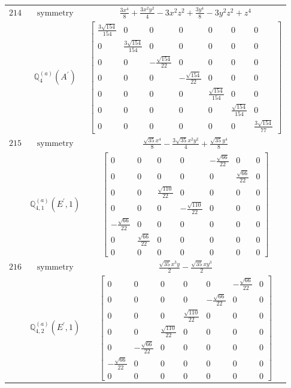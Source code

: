 \documentclass[fleqn,8pt,landscape]{jsarticle}
\begin{document}
\begin{longtable}{ccc}
$ 214 $ & $ \text{symmetry} $ & $ \frac{3 x^{4}}{8} + \frac{3 x^{2} y^{2}}{4} - 3 x^{2} z^{2} + \frac{3 y^{4}}{8} - 3 y^{2} z^{2} + z^{4} $ \\
$  $ & $ \mathbb{Q}_{4}^{(a)}(A^{\prime}) $ & $ \begin{bmatrix} \frac{3 \sqrt{154}}{154} & 0 & 0 & 0 & 0 & 0 & 0 \\ 0 & \frac{3 \sqrt{154}}{154} & 0 & 0 & 0 & 0 & 0 \\ 0 & 0 & - \frac{\sqrt{154}}{22} & 0 & 0 & 0 & 0 \\ 0 & 0 & 0 & - \frac{\sqrt{154}}{22} & 0 & 0 & 0 \\ 0 & 0 & 0 & 0 & \frac{\sqrt{154}}{154} & 0 & 0 \\ 0 & 0 & 0 & 0 & 0 & \frac{\sqrt{154}}{154} & 0 \\ 0 & 0 & 0 & 0 & 0 & 0 & \frac{3 \sqrt{154}}{77} \end{bmatrix} $ \\ \hline
$ 215 $ & $ \text{symmetry} $ & $ \frac{\sqrt{35} x^{4}}{8} - \frac{3 \sqrt{35} x^{2} y^{2}}{4} + \frac{\sqrt{35} y^{4}}{8} $ \\
$  $ & $ \mathbb{Q}_{4,1}^{(a)}(E^{\prime},1) $ & $ \begin{bmatrix} 0 & 0 & 0 & 0 & - \frac{\sqrt{66}}{22} & 0 & 0 \\ 0 & 0 & 0 & 0 & 0 & \frac{\sqrt{66}}{22} & 0 \\ 0 & 0 & \frac{\sqrt{110}}{22} & 0 & 0 & 0 & 0 \\ 0 & 0 & 0 & - \frac{\sqrt{110}}{22} & 0 & 0 & 0 \\ - \frac{\sqrt{66}}{22} & 0 & 0 & 0 & 0 & 0 & 0 \\ 0 & \frac{\sqrt{66}}{22} & 0 & 0 & 0 & 0 & 0 \\ 0 & 0 & 0 & 0 & 0 & 0 & 0 \end{bmatrix} $ \\ \hline
$ 216 $ & $ \text{symmetry} $ & $ \frac{\sqrt{35} x^{3} y}{2} - \frac{\sqrt{35} x y^{3}}{2} $ \\
$  $ & $ \mathbb{Q}_{4,2}^{(a)}(E^{\prime},1) $ & $ \begin{bmatrix} 0 & 0 & 0 & 0 & 0 & - \frac{\sqrt{66}}{22} & 0 \\ 0 & 0 & 0 & 0 & - \frac{\sqrt{66}}{22} & 0 & 0 \\ 0 & 0 & 0 & \frac{\sqrt{110}}{22} & 0 & 0 & 0 \\ 0 & 0 & \frac{\sqrt{110}}{22} & 0 & 0 & 0 & 0 \\ 0 & - \frac{\sqrt{66}}{22} & 0 & 0 & 0 & 0 & 0 \\ - \frac{\sqrt{66}}{22} & 0 & 0 & 0 & 0 & 0 & 0 \\ 0 & 0 & 0 & 0 & 0 & 0 & 0 \end{bmatrix} $ \\ \hline

\end{longtable}
\end{document}
